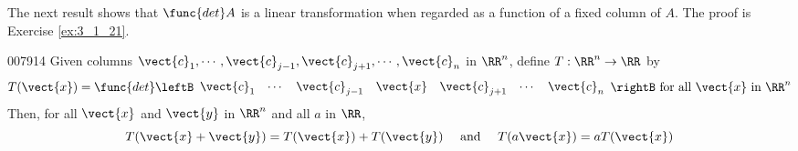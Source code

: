 The next result shows that $\func{det } A$ is a linear transformation when regarded as a function of a fixed column of $A$. The proof is Exercise \ref{ex:3_1_21}.

\begin{theorem}{}{007914}
Given columns $\vect{c}_{1}, \cdots , \vect{c}_{j-1}, \vect{c}_{j+1}, \cdots , \vect{c}_{n}$ in $\RR^n$, define $T: \RR^n \to \RR$ by 
\begin{equation*}
T(\vect{x}) = \func{det} \leftB 
\begin{array}{ccccccc}
\vect{c}_1 & \cdots & \vect{c}_{j-1} & \vect{x} & \vect{c}_{j+1} & \cdots & \vect{c}_n
\end{array} \rightB
\mbox{ for all } \vect{x} \mbox{ in } \RR^n
\end{equation*}
Then, for all $\vect{x}$ and $\vect{y}$ in $\RR^n$ and all $a$ in $\RR$,
\begin{equation*}
T(\vect{x}+\vect{y})= T(\vect{x}) + T(\vect{y}) \quad \mbox{ and } \quad T(a\vect{x}) = aT(\vect{x})
\end{equation*}
\end{theorem}
